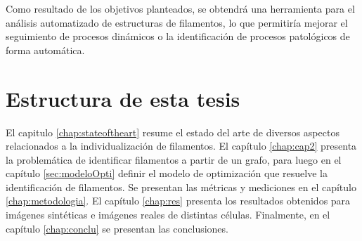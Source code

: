 
Como resultado de los objetivos planteados, se obtendr\'a una herramienta para el an\'alisis automatizado de estructuras de filamentos, lo que permitir\'ia mejorar el seguimiento de procesos din\'amicos o la identificaci\'on de procesos patol\'ogicos de forma autom\'atica.

\section*{Estructura de esta tesis}
El capitulo \ref{chap:stateoftheart} resume el estado del arte de diversos aspectos relacionados a la individualizaci\'on de filamentos. El cap\'itulo \ref{chap:cap2} presenta la problem\'atica de identificar filamentos a partir de un grafo, para luego en el cap\'itulo \ref{sec:modeloOpti} definir el modelo de optimizaci\'on que resuelve la identificaci\'on de filamentos. Se presentan las m\'etricas y mediciones en el cap\'itulo \ref{chap:metodologia}. El cap\'itulo \ref{chap:res} presenta los resultados obtenidos para im\'agenes sint\'eticas e im\'agenes reales de distintas c\'elulas. Finalmente, en el cap\'itulo \ref{chap:conclu} se presentan las conclusiones.

